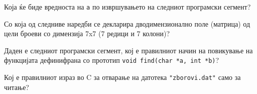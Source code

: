 \documentclass[11pt]{examdesign}
\begin{document}
\begin{multiplechoice}[title={},suppressprefix=yes]
\begin{question}
Која ќе биде вредноста на \texttt{a} по извршувањето на следниот програмски сегмент?
\end{question}

\begin{question}
Со која од следниве наредби се декларира дводимензионално поле (матрица) од цели броеви со димензија 7x7 (7 редици и 7 колони)?
\end{question}
  
\begin{question}
Даден е следниот програмски сегмент, кој е правилниот начин на повикување на функцијата дефинифрана со прототип \texttt{void find(char *а, int *b)}?
\end{question}
  
\begin{question}
Кој е правилниот израз во C за отварање на датотека \texttt{"zborovi.dat"} само за читање?
\end{question}

\end{multiplechoice}
\end{document}
